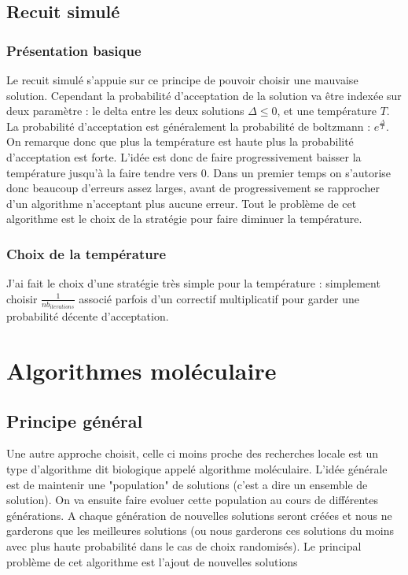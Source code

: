 \documentclass[10pt,a4paper]{article}
\begin{document}
\subsection{Recuit simulé}


\subsubsection{Présentation basique}

Le recuit simulé s'appuie sur ce principe de pouvoir choisir une mauvaise solution. Cependant la probabilité d'acceptation de la solution va être indexée sur deux paramètre : le delta entre les deux solutions $\Delta\leq 0$, et une température $T$. La probabilité d'acceptation est généralement la probabilité de boltzmann : $e^{\frac{\Delta}{T}}$. On remarque donc que plus la température est haute plus la probabilité d'acceptation est forte. L'idée est donc de faire progressivement baisser la température jusqu'à la faire tendre vers 0. Dans un premier temps on s'autorise donc beaucoup d'erreurs assez larges, avant de progressivement se rapprocher d'un algorithme n'acceptant plus aucune erreur. Tout le problème de cet algorithme est le choix de la stratégie pour faire diminuer la température.

\subsubsection{Choix de la température}

J'ai fait le choix d'une stratégie très simple pour la température : simplement choisir $\frac{1}{nb_{iterations}}$ associé parfois d'un correctif multiplicatif pour garder une probabilité décente d'acceptation.

\section{Algorithmes moléculaire}


\subsection{Principe général}

Une autre approche choisit, celle ci moins proche des recherches locale est un type d'algorithme dit biologique appelé algorithme moléculaire. L'idée générale est de maintenir une "population" de solutions (c'est a dire un ensemble de solution). On va ensuite faire evoluer cette population au cours de différentes générations. A chaque génération de nouvelles solutions seront créées et nous ne garderons que les meilleures solutions (ou nous garderons ces solutions du moins avec plus haute probabilité dans le cas de choix randomisés). Le principal problème de cet algorithme est l'ajout de nouvelles solutions
\end{document}
